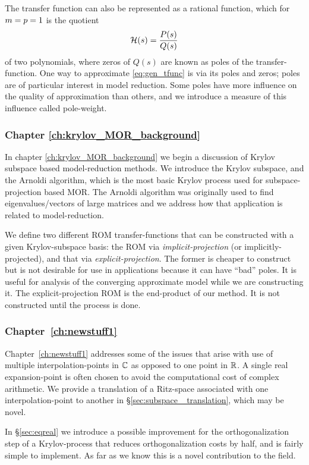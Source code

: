 The transfer function can also be represented as a rational function, which for $m=p=1$ is the quotient  
\[
\mathcal{H}(s) = \frac{P(s)}{Q(s)}
\]
 of two polynomials, where zeros of $Q(s)$ are known as poles of the transfer-function.  One way to approximate \eqref{eq:gen_tfunc} is via its poles and zeros; poles are of particular interest in model reduction.   Some poles have more influence on the quality of approximation  than others, and we introduce a measure of this influence called pole-weight.    

\subsubsection{Chapter \ref{ch:krylov_MOR_background}}
In chapter \ref{ch:krylov_MOR_background} we begin a discussion of Krylov subspace based model-reduction methods.  We introduce the Krylov subspace, and the Arnoldi algorithm, which is the most basic Krylov process used for subspace-projection based MOR.    The Arnoldi algorithm was originally used to find eigenvalues/vectors of large matrices and  we address how that application is related to model-reduction.   

We define two different ROM transfer-functions that can be constructed with a given Krylov-subspace basis:  the ROM via \emph{implicit-projection} (or implicitly-projected), and that via \emph{explicit-projection}.     The former is cheaper to construct but is not desirable for use in applications because it can have ``bad'' poles.  It is useful for analysis of the converging approximate model while we are constructing it.  The explicit-projection ROM is the end-product of our method.   It is not constructed until the process is done.  

\subsubsection{Chapter~\ref{ch:newstuff1}}
Chapter~\ref{ch:newstuff1} addresses some of the issues that arise with use of multiple interpolation-points in $\mathbb{C}$ as opposed to one point in $\mathbb{R}$.   A single real expansion-point is often chosen to avoid the computational cost of complex arithmetic. We provide a translation of a Ritz-space associated with one interpolation-point to another in \S\ref{sec:subspace _translation}, which may be novel.  

    In \S\ref{sec:eqreal} we introduce a possible improvement for the orthogonalization step of a Krylov-process that reduces orthogonalization  costs by half, and is fairly simple to implement.   As far as we know this is a novel contribution to the field.



